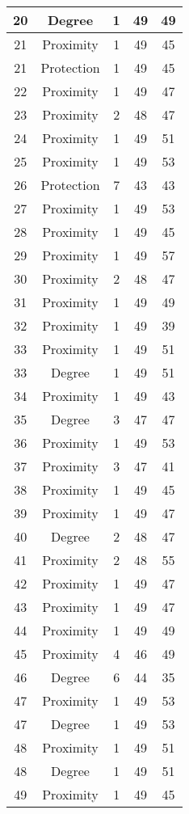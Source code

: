 \documentclass[results.tex]{subfiles}
\begin{document}
\begin{center}
\begin{tabular}{| c || c | c | c | c |}
    \hline
    20 & Degree & 1 & 49 & 49 \\ 
    \hline
    21 & Proximity & 1 & 49 & 45 \\ 
    \hline
    21 & Protection & 1 & 49 & 45 \\ 
    \hline
    22 & Proximity & 1 & 49 & 47 \\ 
    \hline
    23 & Proximity & 2 & 48 & 47 \\ 
    \hline
    24 & Proximity & 1 & 49 & 51 \\ 
    \hline
    25 & Proximity & 1 & 49 & 53 \\ 
    \hline
    26 & Protection & 7 & 43 & 43 \\ 
    \hline
    27 & Proximity & 1 & 49 & 53 \\ 
    \hline
    28 & Proximity & 1 & 49 & 45 \\ 
    \hline
    29 & Proximity & 1 & 49 & 57 \\ 
    \hline
    30 & Proximity & 2 & 48 & 47 \\ 
    \hline
    31 & Proximity & 1 & 49 & 49 \\ 
    \hline
    32 & Proximity & 1 & 49 & 39 \\ 
    \hline
    33 & Proximity & 1 & 49 & 51 \\ 
    \hline
    33 & Degree & 1 & 49 & 51 \\ 
    \hline
    34 & Proximity & 1 & 49 & 43 \\ 
    \hline
    35 & Degree & 3 & 47 & 47 \\ 
    \hline
    36 & Proximity & 1 & 49 & 53 \\ 
    \hline
    37 & Proximity & 3 & 47 & 41 \\ 
    \hline
    38 & Proximity & 1 & 49 & 45 \\ 
    \hline
    39 & Proximity & 1 & 49 & 47 \\ 
    \hline
    40 & Degree & 2 & 48 & 47 \\ 
    \hline
    41 & Proximity & 2 & 48 & 55 \\ 
    \hline
    42 & Proximity & 1 & 49 & 47 \\ 
    \hline
    43 & Proximity & 1 & 49 & 47 \\ 
    \hline
    44 & Proximity & 1 & 49 & 49 \\ 
    \hline
    45 & Proximity & 4 & 46 & 49 \\ 
    \hline
    46 & Degree & 6 & 44 & 35 \\ 
    \hline
    47 & Proximity & 1 & 49 & 53 \\ 
    \hline
    47 & Degree & 1 & 49 & 53 \\ 
    \hline
    48 & Proximity & 1 & 49 & 51 \\ 
    \hline
    48 & Degree & 1 & 49 & 51 \\ 
    \hline
    49 & Proximity & 1 & 49 & 45 \\ 
    \hline   \end{tabular}
\end{center}
\end{document}
